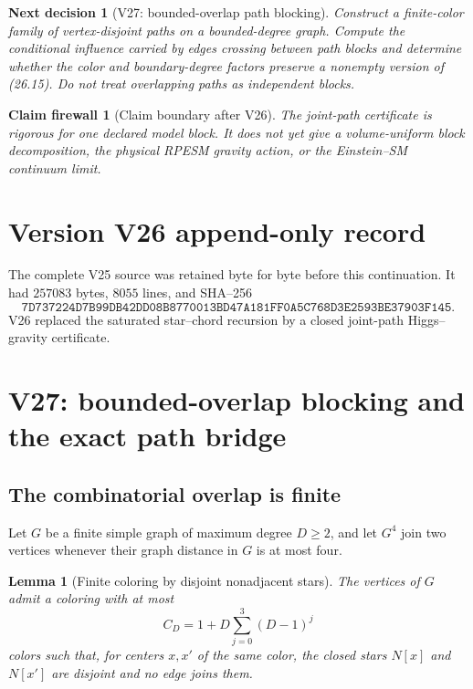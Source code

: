 \documentclass[11pt]{article}
\newtheorem{lemma}[theorem]{Lemma}
\newtheorem{firewall}[theorem]{Claim firewall}
\newtheorem{decision}[theorem]{Next decision}
\theoremstyle{remark}
\begin{document}
\begin{decision}[V27: bounded-overlap path blocking]
\label{dec:v17v26-next}
Construct a finite-color family of vertex-disjoint paths on a
bounded-degree graph.  Compute the conditional influence carried by
edges crossing between path blocks and determine whether the color and
boundary-degree factors preserve a nonempty version of (26.15).  Do
not treat overlapping paths as independent blocks.
\end{decision}

\begin{firewall}[Claim boundary after V26]
\label{fire:v17v26}
The joint-path certificate is rigorous for one declared model block.
It does not yet give a volume-uniform block decomposition, the physical
RPESM gravity action, or the Einstein--SM continuum limit.
\end{firewall}

\section*{Version V26 append-only record}
The complete V25 source was retained byte for byte before this
continuation.  It had \(257083\) bytes, \(8055\) lines, and SHA--256
\[
 \texttt{7D737224D7B99DB42DD08B8770013BD47A181FF0A5C768D3E2593BE37903F145}.
\]
V26 replaced the saturated star--chord recursion by a closed joint-path
Higgs--gravity certificate.


\section{V27: bounded-overlap blocking and the exact path bridge}
\label{sec:v17v27}

\subsection{The combinatorial overlap is finite}

Let \(G\) be a finite simple graph of maximum degree \(D\geq2\), and
let \(G^4\) join two vertices whenever their graph distance in \(G\) is
at most four.

\begin{lemma}[Finite coloring by disjoint nonadjacent stars]
\label{lem:v17v27-color}
The vertices of \(G\) admit a coloring with at most
\[
 C_D=1+D\sum_{j=0}^{3}(D-1)^j                    \tag{27.1}
\]
colors such that, for centers \(x,x'\) of the same color, the closed
stars \(N[x]\) and \(N[x']\) are disjoint and no edge joins them.
\end{lemma}
\end{document}
